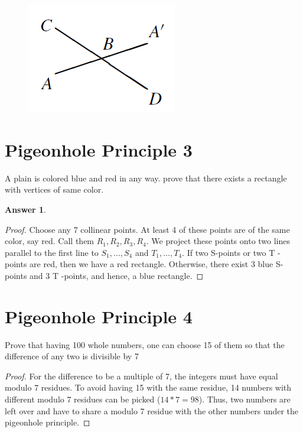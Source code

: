 \documentclass[a4paper]{article}
\renewcommand{\(}{\left(}
\renewcommand{\)}{\right)}
\theoremstyle{plain}
\theoremstyle{plain}
\theoremstyle{definition}
\newtheorem*{answer}{Answer}
\begin{document}
\begin{figure}[h]
\centering
\includegraphics{Problem4Fig1}
\caption{}\label{Problem4Fig1}
\end{figure}

\section{Pigeonhole Principle 3}
A plain is colored blue  and red in any way. prove that there exists a rectangle with vertices of same color.

\begin{shaded}
\begin{answer}
\begin{proof}
Choose any 7 collinear points. At least 4 of these points are of the same color, say
red. Call them $ R_1, R_2, R_3, R_4 $. We project these points onto two lines parallel to the
first line to $S_1, \dots , S_4 $ and $T_1, \dots , T_4$. If two S-points or two T -points are red, then
we have a red rectangle. Otherwise, there exist 3 blue S-points and 3 T -points, and
hence, a blue rectangle.
\end{proof}
\end{answer}
\end{shaded}

\section{Pigeonhole Principle 4}
Prove that having 100 whole numbers, one can choose 15 of them so that the difference of any two is divisible by 7
\begin{shaded}
\begin{proof}
For the difference to be a multiple of 7, the integers must have equal modulo 7 residues. To avoid having 15 with the same residue, 14 numbers with different modulo 7 residues can be picked ($14 * 7 = 98$). Thus, two numbers are left over and have to share a modulo 7 residue with the other numbers under the pigeonhole principle.
\end{proof}
\end{shaded}
\end{document}
